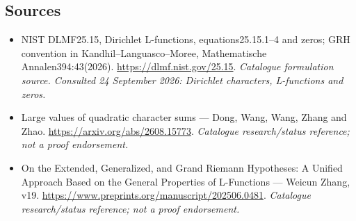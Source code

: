 \documentclass[11pt,a4paper]{article}
\begin{document}
\subsection{Sources}
\begin{itemize}\raggedright
\item[\textnormal{[S1]}]\hypertarget{source:30006676:1}{} NIST DLMF25.15, Dirichlet L-functions, equations25.15.1–4 and zeros; GRH convention in Kandhil–Languasco–Moree, Mathematische Annalen394:43(2026).
\url{https://dlmf.nist.gov/25.15}.
{\small\textit{Catalogue formulation source. Consulted 24 September 2026: Dirichlet characters, L-functions and zeros.}}
\item[\textnormal{[S2]}]\hypertarget{source:30006676:2}{} Large values of quadratic character sums — Dong, Wang, Wang, Zhang and Zhao.
\url{https://arxiv.org/abs/2608.15773}.
{\small\textit{Catalogue research/status reference; not a proof endorsement.}}
\item[\textnormal{[S3]}]\hypertarget{source:30006676:3}{} On the Extended, Generalized, and Grand Riemann Hypotheses: A Unified Approach Based on the General Properties of L-Functions — Weicun Zhang, v19.
\url{https://www.preprints.org/manuscript/202506.0481}.
{\small\textit{Catalogue research/status reference; not a proof endorsement.}}
\end{itemize}

\end{document}
